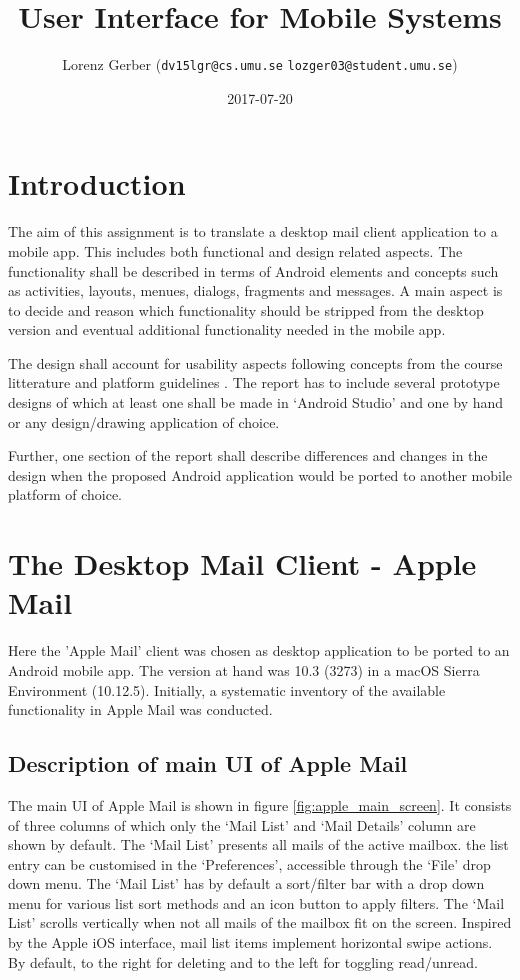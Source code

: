 \documentclass[a4paper,11pt,twoside]{article}
\title{User Interface for Mobile Systems}
\author{Lorenz Gerber ({\tt{dv15lgr@cs.umu.se}} {\tt{lozger03@student.umu.se}})}
\date{2017-07-20}
\begin{document}
\lstset{language=C}
\maketitle
\thispagestyle{empty}
\newpage
\tableofcontents
\thispagestyle{empty}
\newpage

\clearpage
{}

\section{Introduction}
The aim of this assignment is to translate a desktop mail client application to
a mobile app. This includes both functional and design related aspects. The
functionality shall be described in terms of Android elements and concepts such
as activities, layouts, menues, dialogs, fragments and messages. A main aspect is
to decide and reason which functionality should be stripped from the desktop version
and eventual additional functionality needed in the mobile app.

The design shall account for usability aspects following concepts from the
course litterature \cite{clark2015} and platform guidelines \cite{materialdesign}.
The report has to include several prototype designs of which at least one shall be
made in `Android Studio' and one by hand or any design/drawing application of choice.

Further, one section of the report shall describe differences and changes in the
design when the proposed Android application would be ported to another mobile
platform of choice.

\section{The Desktop Mail Client - Apple Mail}
Here the 'Apple Mail' client was chosen as desktop application to be ported to
an Android mobile app. The version at hand was 10.3 (3273) in a macOS Sierra
Environment (10.12.5). Initially, a systematic inventory of the available
functionality in Apple Mail was conducted.

\subsection{Description of main UI of Apple Mail}
The main UI of Apple Mail is shown in figure \ref{fig:apple_main_screen}.
It consists of three columns of which only the `Mail List' and `Mail Details'
column are shown by default. The `Mail List' presents all mails of the active mailbox.
the list entry can be customised in the `Preferences', accessible through the `File'
drop down menu. The `Mail List' has by default a sort/filter bar with a drop down
menu for various list sort methods and an icon button to apply filters. The `Mail
List' scrolls vertically when not all mails of the mailbox fit on the screen.
Inspired by the Apple iOS interface, mail list items implement horizontal swipe
actions. By default, to the right for deleting and to the left for toggling
read/unread.
\end{document}
